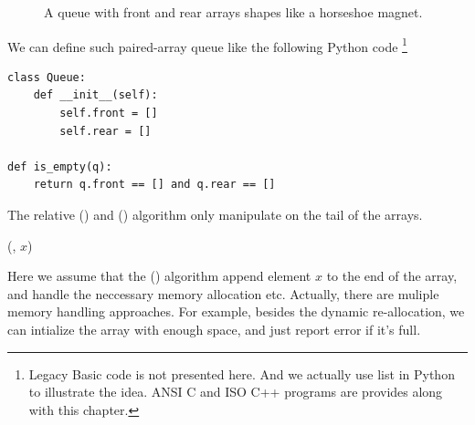 \documentclass{article}
\begin{document}
\begin{figure}[htbp]
  \centering
  \caption{A queue with front and rear arrays shapes like a horseshoe magnet.} \label{fig:horseshoe-array}
\end{figure}

We can define such paired-array queue like the following Python code \footnote{Legacy Basic
code is not presented here. And we actually use list in Python to illustrate the idea.
ANSI C and ISO C++ programs are provides along with this chapter.}

\lstset{language=Python}
\begin{lstlisting}
class Queue:
    def __init__(self):
        self.front = []
        self.rear = []

def is_empty(q):
    return q.front == [] and q.rear == []
\end{lstlisting}

The relative () and () algorithm only manipulate
on the tail of the arrays.

\begin{algorithmic}
  \State {}(, $x$)
\EndFunction
\end{algorithmic}

Here we assume that the () algorithm append element $x$ to
the end of the array, and handle the neccessary memory allocation etc. Actually,
there are muliple memory handling approaches. For example, besides the 
dynamic re-allocation, we can intialize the array with enough space, and just 
report error if it's full.
\end{document}

